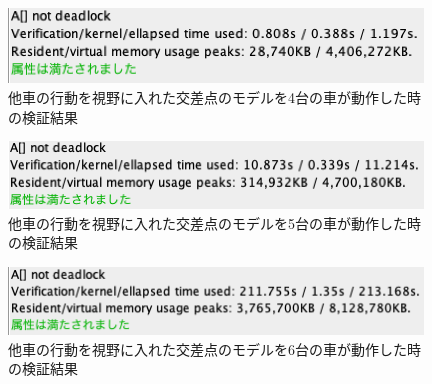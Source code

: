 \documentclass{tpu-sotu}
\begin{document}
	\begin{figure}[htbp]
	\centering
	\includegraphics[width=110mm]{InterBigCar4.png}
	\caption{他車の行動を視野に入れた交差点のモデルを4台の車が動作した時の検証結果}
	\label{IBC4}
	\end{figure}
	\begin{figure}[htbp]
	\centering
	\includegraphics[width=110mm]{InterBigCar5.png}
	\caption{他車の行動を視野に入れた交差点のモデルを5台の車が動作した時の検証結果}
	\label{IBC5}
	\end{figure}
	\begin{figure}[htbp]
	\centering
	\includegraphics[width=110mm]{InterBigCar6.png}
	\caption{他車の行動を視野に入れた交差点のモデルを6台の車が動作した時の検証結果}
	\label{IBC6}
	\end{figure}
	\newpage
\end{document}
